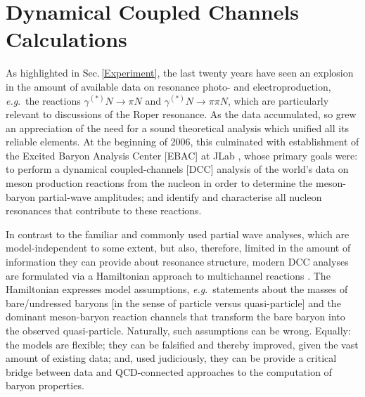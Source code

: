 \setcounter{equation}{0}
\setcounter{figure}{0}
\section{Dynamical Coupled Channels Calculations}
\label{sec:DCC}
As highlighted in Sec.\,\ref{Experiment}, the last twenty years have seen an explosion in the amount of available data on resonance photo- and electroproduction, \emph{e.g}.\ the reactions $\gamma^{(\ast)} N \to \pi N$ and $\gamma^{(\ast)} N \to \pi \pi N$, which are particularly relevant to discussions of the Roper resonance.  As the data accumulated, so grew an appreciation of the need for a sound theoretical analysis which unified all its reliable elements.  At the beginning of 2006, this culminated with establishment of the Excited Baryon Analysis Center [EBAC] at JLab \cite{Lee:2007zy, Kamano:2011ut, Lee:2012mea}, whose primary goals were: to perform a dynamical coupled-channels [DCC] analysis of the world's data on meson production reactions from the nucleon in order to determine the meson-baryon partial-wave amplitudes; and identify and characterise all nucleon resonances that contribute to these reactions.

In contrast to the familiar and commonly used partial wave analyses, which are model-independent to some extent, but also, therefore, limited in the amount of information they can provide about resonance structure, modern DCC analyses are formulated via a Hamiltonian approach to multichannel reactions \cite{JuliaDiaz:2007kz, Suzuki:2009nj, Kamano:2010ud, Ronchen:2012eg, Kamano:2013iva}.  The Hamiltonian expresses model assumptions, \emph{e.g}.\ statements about the masses of bare/undressed baryons [in the sense of particle versus quasi-particle] and the dominant meson-baryon reaction channels that transform the bare baryon into the observed quasi-particle.  Naturally, such assumptions can be wrong.  Equally: the models are flexible; they can be falsified and thereby improved, given the vast amount of existing data; and, used judiciously, they can be provide a critical bridge between data and QCD-connected approaches to the computation of baryon properties.

